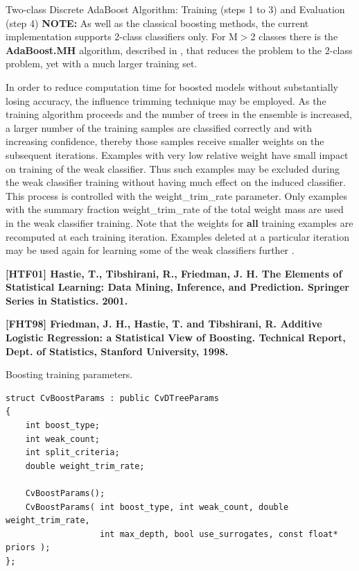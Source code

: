 Two-class Discrete AdaBoost Algorithm: Training (steps 1 to 3) and Evaluation (step 4)
\newline
\newline
\textbf{NOTE:} As well as the classical boosting methods, the current implementation supports 2-class classifiers only. For M$>$2 classes there is the \textbf{AdaBoost.MH} algorithm, described in , that reduces the problem to the 2-class problem, yet with a much larger training set.

In order to reduce computation time for boosted models without substantially losing accuracy, the influence trimming technique may be employed. As the training algorithm proceeds and the number of trees in the ensemble is increased, a larger number of the training samples are classified correctly and with increasing confidence, thereby those samples receive smaller weights on the subsequent iterations. Examples with very low relative weight have small impact on training of the weak classifier. Thus such examples may be excluded during the weak classifier training without having much effect on the induced classifier. This process is controlled with the weight\_trim\_rate parameter. Only examples with the summary fraction weight\_trim\_rate of the total weight mass are used in the weak classifier training. Note that the weights for \textbf{all} training examples are recomputed at each training iteration. Examples deleted at a particular iteration may be used again for learning some of the weak classifiers further .

\textbf{[HTF01] Hastie, T., Tibshirani, R., Friedman, J. H. The Elements of Statistical Learning: Data Mining, Inference, and Prediction. Springer Series in Statistics. 2001.}

\textbf{[FHT98] Friedman, J. H., Hastie, T. and Tibshirani, R. Additive Logistic Regression: a Statistical View of Boosting. Technical Report, Dept. of Statistics, Stanford University, 1998.}



Boosting training parameters.

\begin{lstlisting}
struct CvBoostParams : public CvDTreeParams
{
    int boost_type;
    int weak_count;
    int split_criteria;
    double weight_trim_rate;

    CvBoostParams();
    CvBoostParams( int boost_type, int weak_count, double weight_trim_rate,
                   int max_depth, bool use_surrogates, const float* priors );
};
\end{lstlisting}

